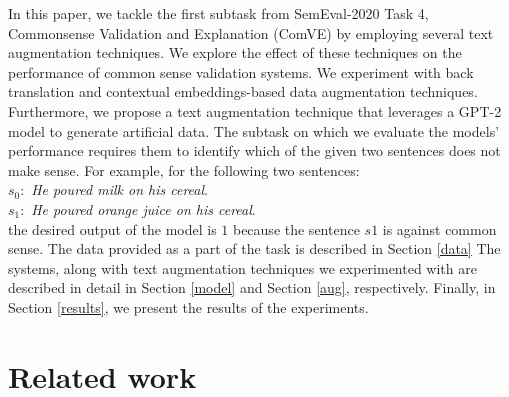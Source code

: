 \documentclass[10pt, a4paper]{article}
\begin{document}
In this paper, we tackle the first subtask from SemEval-2020 Task 4, Commonsense Validation and Explanation (ComVE) \citep{wang-etal-2020-semeval} by employing several text augmentation techniques. We explore the effect of these techniques on the performance of common sense validation systems. We experiment with back translation and contextual embeddings-based data augmentation techniques. Furthermore, we propose a text augmentation technique that leverages a GPT-2 model \citep{radford2019language} to generate artificial data. The subtask on which we evaluate the models' performance requires them to identify which of the given two sentences does not make sense. For example, for the following two sentences:\\
$s_0:$ \textit{He poured milk on his cereal}.\\
$s_1:$ \textit{He poured orange juice on his cereal}.\\
the desired output of the model is $1$ because the sentence $s1$ is against common sense. The data provided as a part of the task is described in Section \ref{data} The systems, along with text augmentation techniques we experimented with are described in detail in Section \ref{model} and Section \ref{aug}, respectively. Finally, in Section \ref{results}, we present the results of the experiments.



\section{Related work}
\label{sec:rw}
\end{document}
